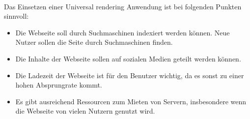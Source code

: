 \documentclass[runningheads]{llncs}
\begin{document}
\\
Das Einsetzen einer Universal rendering Anwendung ist bei folgenden Punkten sinnvoll: 
\begin{itemize}
  \setlength\itemsep{1em}
  \item Die Webseite soll durch Suchmaschinen indexiert werden können. 
    Neue Nutzer sollen die Seite durch Suchmaschinen finden.
  \item Die Inhalte der Webseite sollen auf sozialen Medien geteilt werden können. 
  \item Die Ladezeit der Webseite ist für den Benutzer wichtig, 
  da es sonst zu einer hohen Absprungrate kommt.
  \item Es gibt ausreichend Ressourcen zum Mieten von Servern, 
  insbesondere wenn die Webseite von vielen Nutzern genutzt wird. 
\end{itemize}
\end{document}
